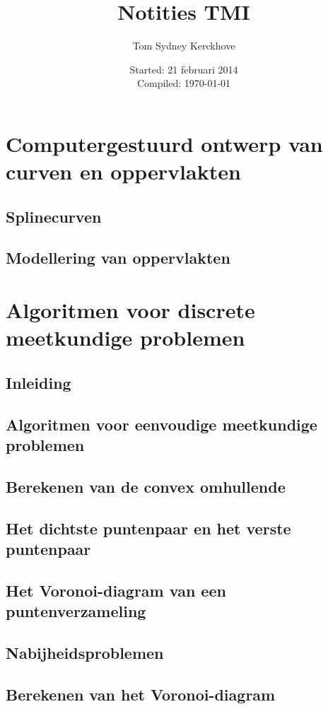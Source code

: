 \documentclass[10pt,a4paper,oneside]{book}
\author{Tom Sydney Kerckhove}
\title{Notities TMI}
\date{Started: 21 februari 2014\\ Compiled: \today}
\begin{document}

\tableofcontents


\part{Computergestuurd ontwerp van curven en oppervlakten}




\chapter{Splinecurven}
\chapter{Modellering van oppervlakten}

\part{Algoritmen voor discrete meetkundige problemen}
\chapter{Inleiding}
\chapter{Algoritmen voor eenvoudige meetkundige problemen}
\chapter{Berekenen van de convex omhullende}
\chapter{Het dichtste puntenpaar en het verste puntenpaar}
\chapter{Het Voronoi-diagram van een puntenverzameling}
\chapter{Nabijheidsproblemen}
\chapter{Berekenen van het Voronoi-diagram}
\end{document}
